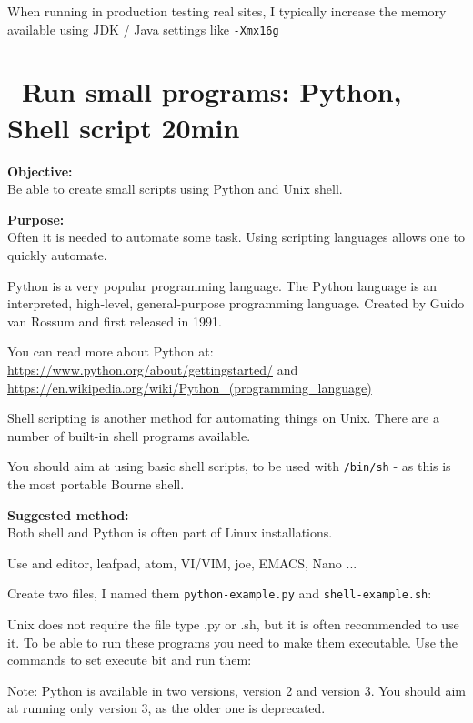 \documentclass[a4paper,11pt,notitlepage]{report}
\begin{document}
When running in production testing real sites, I typically increase the memory available using JDK / Java settings like \verb+-Xmx16g+

\chapter{\faExclamationTriangle\ Run small programs: Python, Shell script 20min}
\label{ex:small-python}

{\bf Objective:}\\
Be able to create small scripts using Python and Unix shell.

{\bf Purpose:}\\
Often it is needed to automate some task. Using scripting languages allows one to quickly automate.

Python is a very popular programming language. The Python language
is an interpreted, high-level, general-purpose programming language. Created by Guido van Rossum and first released in 1991.


You can read more about Python at:\\
\url{https://www.python.org/about/gettingstarted/} and \\
\url{https://en.wikipedia.org/wiki/Python_(programming_language)}

Shell scripting is another method for automating things on Unix. There are a number of built-in shell programs available.

You should aim at using basic shell scripts, to be used with \verb+/bin/sh+ - as this is the most portable Bourne shell.



{\bf Suggested method:}\\
Both shell and Python is often part of Linux installations.

Use and editor, leafpad, atom, VI/VIM, joe, EMACS, Nano ...

Create two files, I named them \verb+python-example.py+ and \verb+shell-example.sh+:



Unix does not require the file type .py or .sh, but it is often recommended to use it. To be able to run these programs you need to make them executable. Use the commands to set execute bit and run them:



Note: Python is available in two versions, version 2 and version 3. You should aim at running only version 3, as the older one is deprecated.
\end{document}
